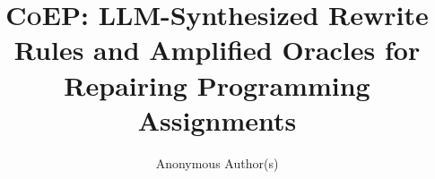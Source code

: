 \documentclass[acmsmall,screen,review,anonymous,nonacm]{acmart}
\begin{document}
\title{\textsc{CoEP}: LLM-Synthesized Rewrite Rules and Amplified Oracles for Repairing Programming Assignments}

\author{Anonymous Author(s)}

\end{document}
